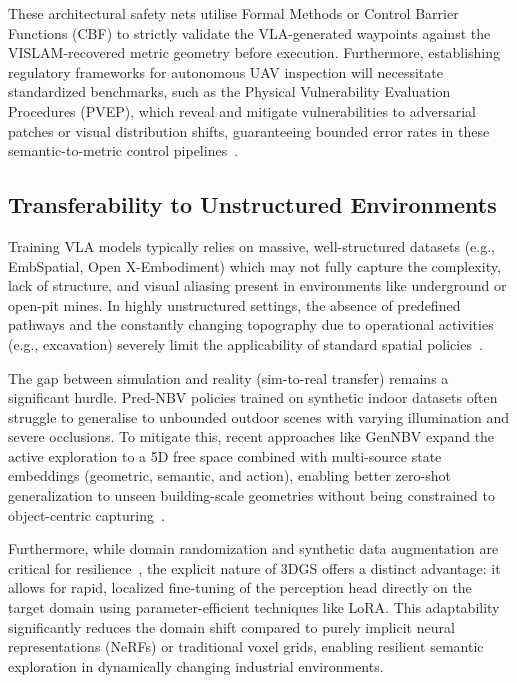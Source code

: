 \documentclass[conference]{IEEEtran}
\begin{document}
These architectural safety nets utilise Formal Methods or Control Barrier Functions (CBF) to strictly validate the VLA-generated waypoints against the VISLAM-recovered metric geometry before execution. Furthermore, establishing regulatory frameworks for autonomous UAV inspection will necessitate standardized benchmarks, such as the Physical Vulnerability Evaluation Procedures (PVEP), which reveal and mitigate vulnerabilities to adversarial patches or visual distribution shifts, guaranteeing bounded error rates in these semantic-to-metric control pipelines~\cite{cheng2024manipulation}.

\subsection{Transferability to Unstructured Environments}
\label{subsec:disc_transfer}

Training VLA models typically relies on massive, well-structured datasets (e.g., EmbSpatial, Open X-Embodiment) which may not fully capture the complexity, lack of structure, and visual aliasing present in environments like underground or open-pit mines. In highly unstructured settings, the absence of predefined pathways and the constantly changing topography due to operational activities (e.g., excavation) severely limit the applicability of standard spatial policies~\cite{wang2022terrain}.

The gap between simulation and reality (sim-to-real transfer) remains a significant hurdle. Pred-NBV policies trained on synthetic indoor datasets often struggle to generalise to unbounded outdoor scenes with varying illumination and severe occlusions. To mitigate this, recent approaches like GenNBV expand the active exploration to a 5D free space combined with multi-source state embeddings (geometric, semantic, and action), enabling better zero-shot generalization to unseen building-scale geometries without being constrained to object-centric capturing~\cite{chen2024gennbv}. 

Furthermore, while domain randomization and synthetic data augmentation are critical for resilience~\cite{zhang2025purevla}, the explicit nature of 3DGS offers a distinct advantage: it allows for rapid, localized fine-tuning of the perception head directly on the target domain using parameter-efficient techniques like LoRA. This adaptability significantly reduces the domain shift compared to purely implicit neural representations (NeRFs) or traditional voxel grids, enabling resilient semantic exploration in dynamically changing industrial environments.
\end{document}
